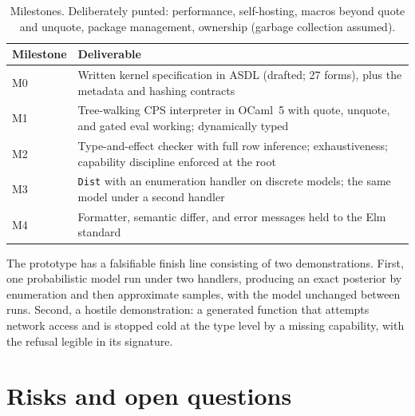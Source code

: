 \documentclass[11pt]{article}
\begin{document}
\begin{table}[ht]
\centering
\small
\begin{tabularx}{\textwidth}{@{}lX@{}}
\toprule
\textbf{Milestone} & \textbf{Deliverable} \\
\midrule
M0 & Written kernel specification in ASDL (drafted; 27 forms), plus the metadata and hashing contracts \\
M1 & Tree-walking CPS interpreter in OCaml~5 with quote, unquote, and gated eval working; dynamically typed \\
M2 & Type-and-effect checker with full row inference; exhaustiveness; capability discipline enforced at the root \\
M3 & \texttt{Dist} with an enumeration handler on discrete models; the same model under a second handler \\
M4 & Formatter, semantic differ, and error messages held to the Elm standard \\
\bottomrule
\end{tabularx}
\caption{Milestones. Deliberately punted: performance, self-hosting, macros beyond quote and unquote, package management, ownership (garbage collection assumed).}
\label{tab:roadmap}
\end{table}

The prototype has a falsifiable finish line consisting of two demonstrations. First, one probabilistic model run under two handlers, producing an exact posterior by enumeration and then approximate samples, with the model unchanged between runs. Second, a hostile demonstration: a generated function that attempts network access and is stopped cold at the type level by a missing capability, with the refusal legible in its signature.

\section{Risks and open questions}
\label{sec:risks}
\end{document}
